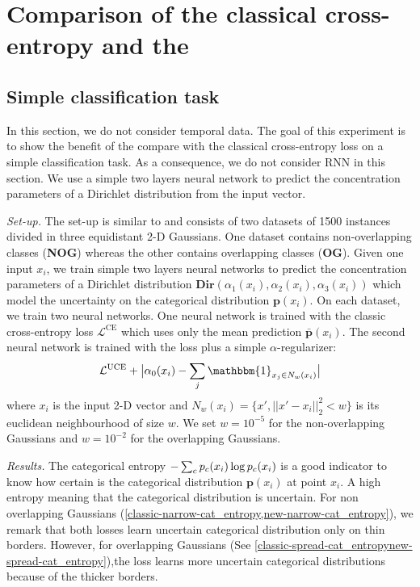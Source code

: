 \section{Comparison of the classical cross-entropy and the \UncertaintyLoss}
\label{uncertain_loss_classification}

\subsection{Simple classification task}

In this section, we do not consider temporal data. The goal of this experiment is to show the benefit of the \UncertaintyLoss compare with the classical cross-entropy loss on a simple classification task. As a consequence, we do not consider RNN in this section. We use a simple two layers neural network to predict the concentration parameters of a Dirichlet distribution from the input vector.

\textit{Set-up.} The set-up is similar to \cite{PriorNetworks} and consists of two datasets of 1500 instances divided in three equidistant 2-D Gaussians. One dataset contains non-overlapping classes (\textbf{NOG}) whereas the other contains overlapping classes (\textbf{OG}). Given one input $x_i$, we train simple two layers neural networks to predict the concentration parameters of a Dirichlet distribution $\textbf{Dir}(\alpha_1(x_i), \alpha_2(x_i), \alpha_3(x_i))$ which model the uncertainty on the categorical distribution $\bm{p}(x_i)$. On each dataset, we train two neural networks. One neural network is trained with the classic cross-entropy loss $\mathcal{L}^{\text{CE}}$ which uses only the mean prediction $\bar{\bm{p}}(x_i)$. The second neural network is trained with the \UncertaintyLoss loss plus a simple $\alpha$-regularizer:
\begin{equation}
\begin{aligned}
\mathcal{L}^{\text{UCE}} + \bigl\lvert\alpha_0(x_i) - \sum_j  \mathbbm{1}_{x_j \in N_w(x_i) }\bigr\rvert
\end{aligned}
\end{equation}
where $x_i$ is the input 2-D vector and $N_w(x_i) = \{x', ||x' - x_i||_2^2 < w\}$ is its euclidean neighbourhood of size $w$. We set $w=10^{-5}$ for the non-overlapping Gaussians and $w=10^{-2}$ for the overlapping Gaussians.

\textit{Results.} The categorical entropy $-\sum_c p_c(x_i) \log p_c(x_i)$ is a good indicator to know how certain is the categorical distribution $\bm{p}(x_i)$ at point $x_i$. A high entropy meaning that the categorical distribution is uncertain. For non overlapping Gaussians (\cref{classic-narrow-cat_entropy,new-narrow-cat_entropy}), we remark that both losses learn uncertain categorical distribution only on thin borders. However, for overlapping Gaussians (See \cref{classic-spread-cat_entropynew-spread-cat_entropy}),the \UncertaintyLoss loss learns more uncertain categorical distributions because of the thicker borders.

